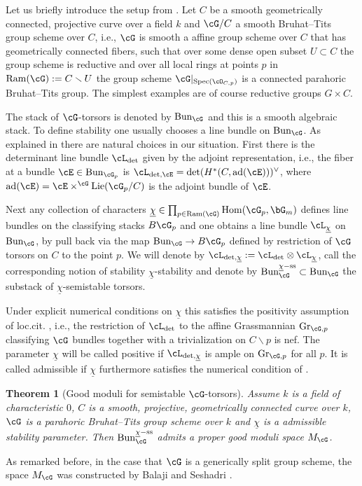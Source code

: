 \documentclass[a4paper]{amsart}
\numberwithin{equation}{section}
\theoremstyle{plain}
\newtheorem{thm}{Theorem}[section]
\theoremstyle{definition}
\DeclareMathOperator{\Spec}{Spec}
\DeclareMathOperator{\Hom}{Hom}
\DeclareMathOperator{\Bun}{Bun}
\newcommand{\tensor}{\otimes}
\renewcommand{\ss}{{\rm ss}}
\DeclareMathOperator{\Lie}{Lie}
\DeclareMathOperator{\Ram}{Ram}
\DeclareMathOperator{\ad}{ad}
\DeclareMathOperator{\Gr}{Gr}
\begin{document}
Let us briefly introduce the setup from \cite{heinloth-stability}. Let $C$ be a smooth geometrically connected, projective curve over a field $k$ and $\cG/C$ a smooth Bruhat--Tits group scheme over $C$, i.e., $\cG$ is smooth a affine group scheme over $C$ that has geometrically connected fibers, such that over some dense open subset $U\subset C$ the group scheme is reductive and over all local rings at points $p$ in $\Ram(\cG) := C\smallsetminus U$ the group scheme $\cG|_{\Spec(\cO_{C,p})}$ is a connected parahoric Bruhat--Tits group. The simplest examples are of course reductive groups $G\times C$.

The stack of $\cG$-torsors is denoted by $\Bun_{\cG}$ and this is a smooth algebraic stack. To define stability one usually chooses a line bundle on $\Bun_{\cG}$. As explained in \cite[\S 3.B]{heinloth-stability} there are natural choices in our situation. First there is the determinant line bundle $\cL_{\det}$ given by the adjoint representation, i.e., the fiber at a bundle $\cE\in \Bun_{\cG_p}$ is $\cL_{\det,\cE} = \det(H^*(C,\ad(\cE)))^\vee$, where $\ad(\cE)=\cE\times^{\cG}\Lie(\cG_p/C)$ is the adjoint bundle of $\cE$.

Next any collection of characters $\underline{\chi}\in \prod_{p\in \Ram(\cG)} \Hom(\cG_p,\bG_m)$ defines line bundles on the classifying stacks $B\cG_p$ and one obtains  a line bundle $\cL_{\underline{\chi}}$ on $\Bun_{\cG}$, by pull back via the map $\Bun_{\cG} \to B\cG_p$ defined by restriction of $\cG$ torsors on $C$ to the point $p$. We will denote by $\cL_{\det,\underline{\chi}}:=\cL_{\det}\tensor \cL_{\underline{\chi}}$, call the corresponding notion of stability $\underline{\chi}$-stability and denote by $\Bun_{\cG}^{\underline{\chi}-\ss} \subset \Bun_{\cG}$ the substack of $\underline{\chi}$-semistable torsors.

Under explicit numerical conditions on $\underline{\chi}$ this satisfies the positivity assumption of loc.cit. \cite[Prop.~3.3]{heinloth-stability}, i.e., the restriction of $\cL_{\det}$ to the affine Grassmannian $\Gr_{\cG,p}$ classifying $\cG$ bundles together with a trivialization on $C\smallsetminus p$ is nef. 
The parameter $\underline{\chi}$ will be called positive if $\cL_{\det,\underline{\chi}}$ is ample on $\Gr_{\cG,p}$ for all $p$. It is called admissible if $\underline{\chi}$ furthermore satisfies the numerical condition of \cite[Sec. 3.F]{heinloth-stability}.

\begin{thm}[Good moduli for semistable $\cG$-torsors]\label{T:GoodModuliBunG}
	Assume $k$ is a field of characteristic $0$, $C$ is a smooth, projective, geometrically connected curve over $k$, $\cG$ is a parahoric Bruhat--Tits group scheme over $k$ and $\underline{\chi}$ is a admissible stability parameter. 
	Then $\Bun_{\cG}^{\underline{\chi}-\ss}$ admits a proper good moduli space $M_{\cG}$.
\end{thm}
As remarked before, in the case that $\cG$ is a generically split group scheme, the space $M_{\cG}$ was constructed by Balaji and Seshadri \cite{BalajiSeshadri}.
\end{document}
